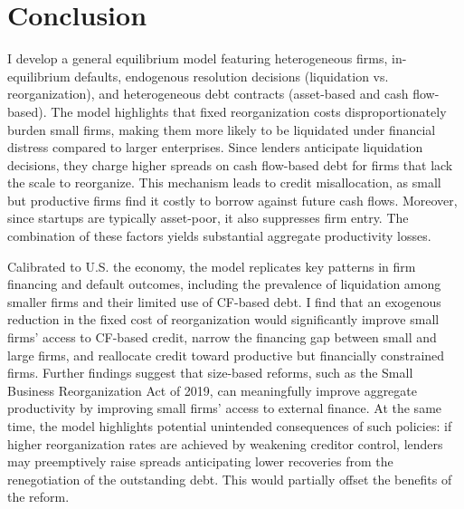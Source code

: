 \documentclass[12pt]{article}
\begin{document}
\section{Conclusion}

I develop a general equilibrium model featuring heterogeneous firms, in-equilibrium defaults, endogenous resolution decisions (liquidation vs. reorganization), and heterogeneous debt contracts (asset-based and cash flow-based). The model highlights that fixed reorganization costs disproportionately burden small firms, making them more likely to be liquidated under financial distress compared to larger enterprises. Since lenders anticipate liquidation decisions, they charge higher spreads on cash flow-based debt for firms that lack the scale to reorganize. This mechanism leads to credit misallocation, as small but productive firms find it costly to borrow against future cash flows. Moreover, since startups are typically asset-poor, it also suppresses firm entry. The combination of these factors yields substantial aggregate productivity losses.

Calibrated to U.S. the economy, the model replicates key patterns in firm financing and default outcomes, including the prevalence of liquidation among smaller firms and their limited use of CF-based debt. I find that an exogenous reduction in the fixed cost of reorganization would significantly improve small firms' access to CF-based credit, narrow the financing gap between small and large firms, and reallocate credit toward productive but financially constrained firms. Further findings suggest that size-based reforms, such as the Small Business Reorganization Act of 2019, can meaningfully improve aggregate productivity by improving small firms’ access to external finance. At the same time, the model highlights potential unintended consequences of such policies: if higher reorganization rates are achieved by weakening creditor control, lenders may preemptively raise spreads anticipating lower recoveries from the renegotiation of the outstanding debt. This would partially offset the benefits of the reform.
\end{document}
